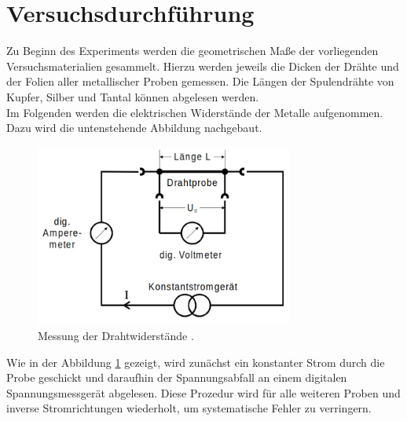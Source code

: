 %

%


\section{Versuchsdurchführung}
\label{sec:Versuchsdurchfuehrung}

Zu Beginn des Experiments werden die geometrischen Maße der vorliegenden Versuchsmaterialien gesammelt. Hierzu 
werden jeweils die Dicken der Drähte und der Folien aller metallischer Proben gemessen. Die Längen der Spulendrähte
von Kupfer, Silber und Tantal können abgelesen werden.\\

\noindent Im Folgenden werden die elektrischen Widerstände der Metalle aufgenommen. Dazu wird die untenstehende Abbildung 
nachgebaut.

\begin{figure}
    \centering
    \includegraphics[height=6cm]{content/Widerstand.png}
    \caption{Messung der Drahtwiderstände \cite{Versuchsanleitung_v511}.}
    \label{fig:Widerstand}
\end{figure}

\noindent Wie in der Abbildung \ref{fig:Widerstand} gezeigt, wird zunächst ein konstanter Strom durch die Probe geschickt
und daraufhin der Spannungsabfall an einem digitalen Spannungsmessgerät abgelesen. Diese Prozedur wird für alle weiteren Proben und 
inverse Stromrichtungen wiederholt, um systematische Fehler zu verringern.\\

